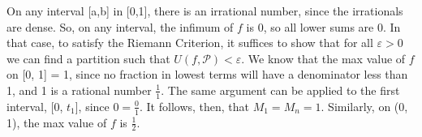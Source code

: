 \documentclass{article}
\begin{document}
On any interval [a,b] in [0,1], there is an irrational number, since the irrationals are dense. So, on any interval, the infimum of $f$ is 0, so all lower sums are 0. In that case, to satisfy the Riemann Criterion, it suffices to show that for all $\varepsilon > 0$ we can find a partition such that $U(f, \mathcal{P}) < \varepsilon$. We know that the max value of $f$ on [0, 1] = 1, since no fraction in lowest terms will have a denominator less than 1, and 1 is a rational number $\frac{1}{1}$. The same argument can be applied to the first interval, [0, $t_1$], since $0 = \frac{0}{1}$. It follows, then, that $M_{1} = M_{n} = 1$. Similarly, on (0, 1), the max value of $f$ is $\frac{1}{2}$. 
 
\end{document}
